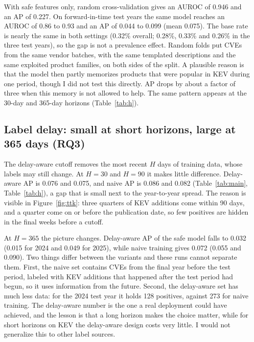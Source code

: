 \documentclass[conference,a4paper]{IEEEtran}
\begin{document}
With safe features only, random cross-validation gives an AUROC of 0.946 and an AP of 0.227. On forward-in-time test years the same model reaches an AUROC of 0.86 to 0.93 and an AP of 0.044 to 0.099 (mean 0.075). The base rate is nearly the same in both settings (0.32\% overall; 0.28\%, 0.33\% and 0.26\% in the three test years), so the gap is not a prevalence effect. Random folds put CVEs from the same vendor batches, with the same templated descriptions and the same exploited product families, on both sides of the split. A plausible reason is that the model then partly memorizes products that were popular in KEV during one period, though I did not test this directly. AP drops by about a factor of three when this memory is not allowed to help. The same pattern appears at the 30-day and 365-day horizons (Table~\ref{tab:h}).

\subsection{Label delay: small at short horizons, large at 365 days (RQ3)}

The delay-aware cutoff removes the most recent $H$ days of training data, whose labels may still change. At $H=30$ and $H=90$ it makes little difference. Delay-aware AP is 0.076 and 0.075, and naive AP is 0.086 and 0.082 (Table~\ref{tab:main}, Table~\ref{tab:h}), a gap that is small next to the year-to-year spread. The reason is visible in Figure~\ref{fig:ttk}: three quarters of KEV additions come within 90 days, and a quarter come on or before the publication date, so few positives are hidden in the final weeks before a cutoff.

At $H=365$ the picture changes. Delay-aware AP of the safe model falls to 0.032 (0.015 for 2024 and 0.049 for 2025), while naive training gives 0.072 (0.055 and 0.090). Two things differ between the variants and these runs cannot separate them. First, the naive set contains CVEs from the final year before the test period, labeled with KEV additions that happened after the test period had begun, so it uses information from the future. Second, the delay-aware set has much less data: for the 2024 test year it holds 128 positives, against 273 for naive training. The delay-aware number is the one a real deployment could have achieved, and the lesson is that a long horizon makes the choice matter, while for short horizons on KEV the delay-aware design costs very little. I would not generalize this to other label sources.
\end{document}
